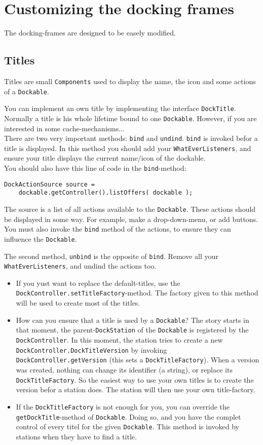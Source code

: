 \documentclass{article}
\begin{document}
\section{Customizing the docking frames}
The docking-frames are designed to be easely modified.


\subsection{Titles}
Titles are small \verb!Components! used to display the name, the icon and some actions of a \verb!Dockable!.

You can implement an own title by implementing the interface \verb!DockTitle!. Normally a title is his whole lifetime bound to one \verb!Dockable!. However, if you are interested in some cache-mechanisms...\\
There are two very important methods: \verb!bind! and \verb!undind!. \verb!bind! is invoked befor a title is displayed. In this method you should add your \verb!WhatEverListeners!, and ensure your title displays the current name/icon of the dockable. \\
You should also have this line of code in the \verb!bind!-method:
\begin{lstlisting}
DockActionSource source = 
    dockable.getController().listOffers( dockable );
\end{lstlisting}
The source is a list of all actions available to the \verb!Dockable!. These actions should be displayed in some way. For example, make a drop-down-menu, or add buttons. You must also invoke the \verb!bind! method of the actions, to ensure they can influence the \verb!Dockable!.

The second method, \verb!unbind! is the opposite of \verb!bind!. Remove all your \verb!WhatEverListeners!, and undind the actions too.

\begin{itemize}
\item If you yust want to replace the default-titles, use the \verb!DockController.setTitleFactory!-method. The factory given to this method will be used to create most of the titles.
\item How can you ensure that a title is used by a \verb!Dockable!? The story starts in that moment, the parent-\verb!DockStation! of the \verb!Dockable! is registered by the \verb!DockController!. In this moment, the station tries to create a new \\\verb!DockController.DockTitleVersion! by invoking \verb!DockController.getVersion! (this sets a \verb!DockTitleFactory!). When a version was created, nothing can change its identifier (a string), or replace its \verb!DockTitleFactory!. So the easiest way to use your own titles is to create the version befor a station does. The station will then use your own title-factory.
\item If the \verb!DockTitleFactory! is not enough for you, you can override the \\\verb!getDockTitle!-method of \verb!Dockable!. Doing so, and you have the complet control of every titel for the given \verb!Dockable!. This method is invoked by stations when they have to find a title.
\end{itemize}
\end{document}
